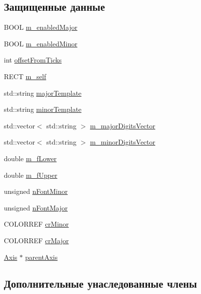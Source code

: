 \subsection*{Защищенные данные}
\begin{DoxyCompactItemize}
\item 
B\-O\-O\-L \hyperlink{class_digits_aaf6398adc6029e62a5b437575e1dc9df}{m\-\_\-enabled\-Major}
\item 
B\-O\-O\-L \hyperlink{class_digits_a3cd58217fb3282ac4e326c3aba8e5014}{m\-\_\-enabled\-Minor}
\item 
int \hyperlink{class_digits_a6363bd7d08bcf1af1f631542007d576b}{offset\-From\-Ticks}
\item 
R\-E\-C\-T \hyperlink{class_digits_ae4aaf160c1fb1a64da858021e376f84b}{m\-\_\-self}
\item 
std\-::string \hyperlink{class_digits_abbe65de11a5be175f825f2727212fe07}{major\-Template}
\item 
std\-::string \hyperlink{class_digits_a6742b3cfd0643d81fea94f4b43bab302}{minor\-Template}
\item 
std\-::vector$<$ std\-::string $>$ \hyperlink{class_digits_a8f37710ae3695963c053ac86907b53c5}{m\-\_\-major\-Digits\-Vector}
\item 
std\-::vector$<$ std\-::string $>$ \hyperlink{class_digits_a2382cd829aa6469431b38f447d9570d8}{m\-\_\-minor\-Digits\-Vector}
\item 
double \hyperlink{class_digits_a086ddfadf3a92ce92096b65841b0a57e}{m\-\_\-f\-Lower}
\item 
double \hyperlink{class_digits_aaadbe21fd0151547ad2aad4dadd82516}{m\-\_\-f\-Upper}
\item 
unsigned \hyperlink{class_digits_ad072b45337ed3492f7798caa246344fe}{n\-Font\-Minor}
\item 
unsigned \hyperlink{class_digits_a7e78c6880a781fef583b8ab06e214c2c}{n\-Font\-Major}
\item 
C\-O\-L\-O\-R\-R\-E\-F \hyperlink{class_digits_ab100cdfd65503955b4d052085c47078a}{cr\-Minor}
\item 
C\-O\-L\-O\-R\-R\-E\-F \hyperlink{class_digits_ae1dbae5da268f81449d27800c19798e6}{cr\-Major}
\item 
\hyperlink{class_axis}{Axis} $\ast$ \hyperlink{class_digits_a40f4adf8eaf3b89b66adbbccc2099d5d}{parent\-Axis}
\end{DoxyCompactItemize}
\subsection*{Дополнительные унаследованные члены}


